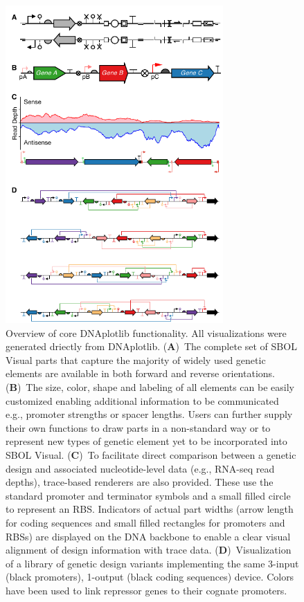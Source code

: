 \documentclass{bioinfo}
\begin{document}
\begin{figure}[tb]
\centering
\includegraphics[width=8.3cm]{Figure1.pdf}
\caption{\label{fig:overview}Overview of core DNAplotlib functionality. All visualizations were generated driectly from DNAplotlib. (\textbf{A})~The complete set of SBOL Visual parts that capture the majority of widely used genetic elements are available in both forward and reverse orientations. (\textbf{B})~The size, color, shape and labeling of all elements can be easily customized enabling additional information to be communicated e.g., promoter strengths or spacer lengths. Users can further supply their own functions to draw parts in a non-standard way or to represent new types of genetic element yet to be incorporated into SBOL Visual. (\textbf{C})~To facilitate direct comparison between a genetic design and associated nucleotide-level data (e.g., RNA-seq read depths), trace-based renderers are also provided. These use the standard promoter and terminator symbols and a small filled circle to represent an RBS. Indicators of actual part widths (arrow length for coding sequences and small filled rectangles for promoters and RBSs) are displayed on the DNA backbone to enable a clear visual alignment of design information with trace data. (\textbf{D})~Visualization of a library of genetic design variants implementing the same 3-input (black promoters), 1-output (black coding sequences) device. Colors have been used to link repressor genes to their cognate promoters.}
\end{figure}
\end{document}
